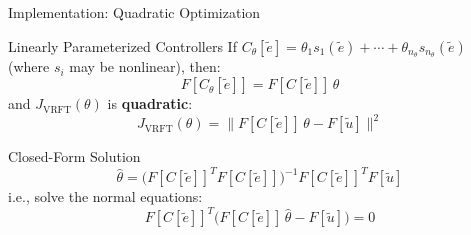 \documentclass[hyperref={pdfpagemode=FullScreen},aspectratio=169]{beamer}
\newcommand{\highlight}[1]{{\color{accentgreen!70!black}\textbf{#1}}}
\newcommand{\JJ}{J_{\mathrm{VRFT}}}
\begin{document}
\begin{frame}{Implementation: Quadratic Optimization}
      \begin{block}{Linearly Parameterized Controllers}
        If $C_\theta[\tilde{e}] = \theta_1 s_1(\tilde{e}) + \cdots + \theta_{n_\theta} s_{n_\theta}(\tilde{e})$
        (where $s_i$ may be nonlinear), then:
        \[
          F[C_\theta[\tilde{e}]] = F[C[\tilde{e}]]\,\theta
        \]
        and $\JJ(\theta)$ is \highlight{quadratic}:
        \[
          \JJ(\theta) = \|F[C[\tilde{e}]]\,\theta - F[\tilde{u}]\|^2
        \]
      \end{block}
      \vspace{0.3em}
      \begin{block}{Closed-Form Solution}
        \[
          \hat\theta = \bigl(F[C[\tilde{e}]]^T F[C[\tilde{e}]]\bigr)^{-1} F[C[\tilde{e}]]^T F[\tilde{u}]
        \]
        i.e., solve the normal equations:
        \[
          F[C[\tilde{e}]]^T\bigl(F[C[\tilde{e}]]\,\hat\theta - F[\tilde{u}]\bigr) = 0
        \]
      \end{block}

\end{frame}
\end{document}
